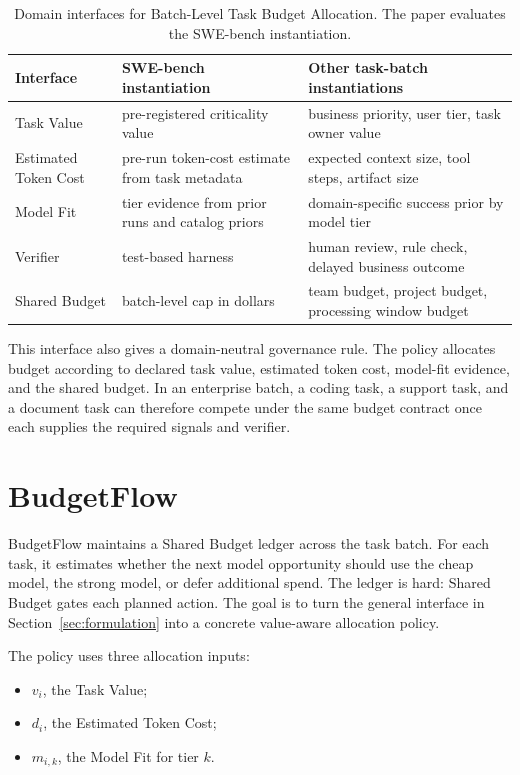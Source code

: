 \documentclass{article}
\newcommand{\method}{BudgetFlow\xspace}
\newcommand{\taskvalue}{Task Value\xspace}
\newcommand{\tokencost}{Estimated Token Cost\xspace}
\newcommand{\modelfit}{Model Fit\xspace}
\newcommand{\sharedbudget}{Shared Budget\xspace}
\newcommand{\verifier}{Verifier\xspace}
\begin{document}
\begin{table}[t]
\centering
\small
\begin{tabular}{p{}p{}p{}}
\toprule
Interface & SWE-bench instantiation & Other task-batch instantiations \\
\midrule
\taskvalue & pre-registered criticality value & business priority, user tier, task owner value \\
\tokencost & pre-run token-cost estimate from task metadata & expected context size, tool steps, artifact size \\
\modelfit & tier evidence from prior runs and catalog priors & domain-specific success prior by model tier \\
\verifier & test-based harness & human review, rule check, delayed business outcome \\
\sharedbudget & batch-level cap in dollars & team budget, project budget, processing window budget \\
\bottomrule
\end{tabular}
\caption{Domain interfaces for Batch-Level Task Budget Allocation. The paper evaluates the SWE-bench instantiation.}
\label{tab:interfaces}
\vspace{0.6em}
\end{table}

This interface also gives a domain-neutral governance rule. The policy allocates budget according to declared task value, estimated token cost, model-fit evidence, and the shared budget. In an enterprise batch, a coding task, a support task, and a document task can therefore compete under the same budget contract once each supplies the required signals and verifier.

\section{BudgetFlow}
\label{sec:method}
\method maintains a \sharedbudget ledger across the task batch. For each task, it estimates whether the next model opportunity should use the cheap model, the strong model, or defer additional spend. The ledger is hard: \sharedbudget gates each planned action. The goal is to turn the general interface in Section~\ref{sec:formulation} into a concrete value-aware allocation policy.

The policy uses three allocation inputs:

\begin{itemize}
    \item $v_i$, the \taskvalue;
    \item $d_i$, the \tokencost;
    \item $m_{i,k}$, the \modelfit for tier $k$.
\end{itemize}
\end{document}
